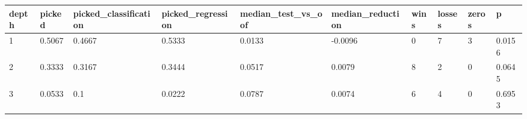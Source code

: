 \begin{tabular}{llllllllll}
\toprule
depth & picked & picked\_classification & picked\_regression & median\_test\_vs\_oof & median\_reduction & wins & losses & zeros & p \\
\midrule
1 & 0.5067 & 0.4667 & 0.5333 & 0.0133 & -0.0096 & 0 & 7 & 3 & 0.0156 \\
2 & 0.3333 & 0.3167 & 0.3444 & 0.0517 & 0.0079 & 8 & 2 & 0 & 0.0645 \\
3 & 0.0533 & 0.1 & 0.0222 & 0.0787 & 0.0074 & 6 & 4 & 0 & 0.6953 \\
\bottomrule
\end{tabular}
